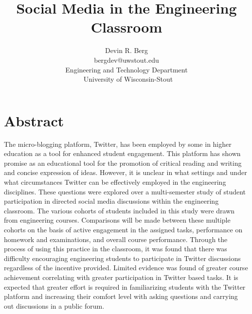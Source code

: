 \documentclass[12pt]{article}
\title{Social Media in the Engineering Classroom} %
\author{\vspace{-5ex}}
\author{\normalsize Devin R. Berg\\
\normalsize bergdev@uwstout.edu\\
\normalsize Engineering and Technology Department\\\
\normalsize University of Wisconsin-Stout}
\date{\vspace{-5ex}} %
\begin{document}
\raggedright
\maketitle
\thispagestyle{empty}
\pagestyle{empty}

\section*{Abstract}
The micro-blogging platform, Twitter, has been employed by some in higher education as a tool for enhanced student engagement. This platform has shown promise as an educational tool for the promotion of critical reading and writing and concise expression of ideas. However, it is unclear in what settings and under what circumstances Twitter can be effectively employed in the engineering disciplines. These questions were explored over a multi-semester study of student participation in directed social media discussions within the engineering classroom. The various cohorts of students included in this study were drawn from engineering courses. Comparisons will be made between these multiple cohorts on the basis of active engagement in the assigned tasks, performance on homework and examinations, and overall course performance. Through the process of using this practice in the classroom, it was found that there was difficulty encouraging engineering students to participate in Twitter discussions regardless of the incentive provided. Limited evidence was found of greater course achievement correlating with greater participation in Twitter based tasks. It is expected that greater effort is required in familiarizing students with the Twitter platform and increasing their comfort level with asking questions and carrying out discussions in a public forum.
\end{document}
